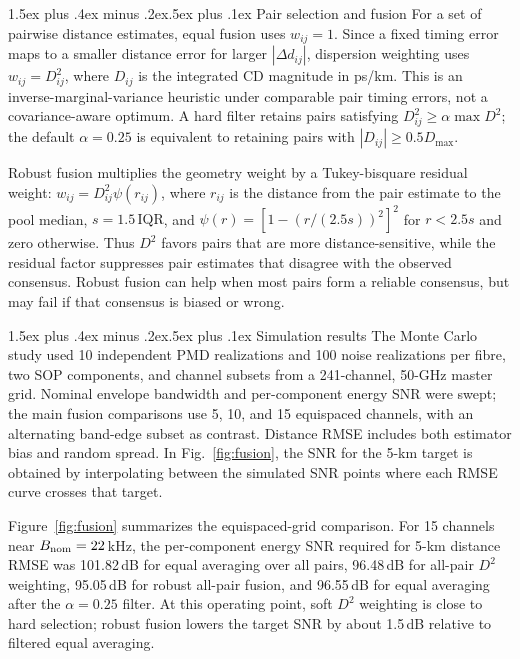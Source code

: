 \documentclass[10pt]{article}
\makeatletter
\renewcommand\section{\@startsection{section}{1}{\z@}%
  {1.5ex plus .4ex minus .2ex}{.5ex plus .1ex}%
  {\normalfont\large\bfseries}}
\makeatother
\begin{document}
\section{Pair selection and fusion}
For a set of pairwise distance estimates, equal fusion uses $w_{ij}=1$. Since a fixed timing error maps to a smaller distance error for larger $|\Delta d_{ij}|$, dispersion weighting uses $w_{ij}=D_{ij}^2$, where $D_{ij}$ is the integrated CD magnitude in ps/km. This is an inverse-marginal-variance heuristic under comparable pair timing errors, not a covariance-aware optimum. A hard filter retains pairs satisfying $D_{ij}^2\ge\alpha\max D^2$; the default $\alpha=0.25$ is equivalent to retaining pairs with $|D_{ij}|\ge0.5D_{\max}$.

Robust fusion multiplies the geometry weight by a Tukey-bisquare residual weight: $w_{ij}=D_{ij}^2\psi(r_{ij})$, where $r_{ij}$ is the distance from the pair estimate to the pool median, $s=1.5\,\mathrm{IQR}$, and $\psi(r)=[1-(r/(2.5s))^2]^2$ for $r<2.5s$ and zero otherwise. Thus $D^2$ favors pairs that are more distance-sensitive, while the residual factor suppresses pair estimates that disagree with the observed consensus. Robust fusion can help when most pairs form a reliable consensus, but may fail if that consensus is biased or wrong.

\section{Simulation results}
The Monte Carlo study used 10 independent PMD realizations and 100 noise realizations per fibre, two SOP components, and channel subsets from a 241-channel, 50-GHz master grid. Nominal envelope bandwidth and per-component energy SNR were swept; the main fusion comparisons use 5, 10, and 15 equispaced channels, with an alternating band-edge subset as contrast. Distance RMSE includes both estimator bias and random spread. In Fig.~\ref{fig:fusion}, the SNR for the 5-km target is obtained by interpolating between the simulated SNR points where each RMSE curve crosses that target.

Figure~\ref{fig:fusion} summarizes the equispaced-grid comparison. For 15 channels near $B_{\rm nom}=22$\,kHz, the per-component energy SNR required for 5-km distance RMSE was 101.82\,dB for equal averaging over all pairs, 96.48\,dB for all-pair $D^2$ weighting, 95.05\,dB for robust all-pair fusion, and 96.55\,dB for equal averaging after the $\alpha=0.25$ filter. At this operating point, soft $D^2$ weighting is close to hard selection; robust fusion lowers the target SNR by about 1.5\,dB relative to filtered equal averaging.
\end{document}
